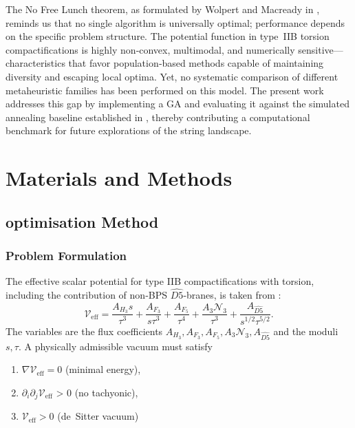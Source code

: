 \documentclass[runningheads]{llncs}
\begin{document}
The No Free Lunch theorem, as formulated by Wolpert and
Macready in \cite{Wolpert1997}, reminds us that no
single algorithm is universally optimal; performance
depends on the specific problem structure. The potential
function in type~IIB torsion compactifications is highly
non‑convex, multimodal, and numerically sensitive—
characteristics that favor population‑based methods
capable of maintaining diversity and escaping local
optima. Yet, no systematic comparison of different
metaheuristic families has been performed on this model.
The present work addresses this gap by implementing a GA
and evaluating it against the simulated annealing
baseline established in \cite{Damian2022}, thereby
contributing a computational benchmark for future
explorations of the string landscape.


\section{Materials and Methods}

\subsection{optimisation Method}

\subsubsection{Problem Formulation}
The effective scalar potential for type IIB compactifications
with torsion, including the contribution of non‑BPS
$\widehat{D5}$‑branes, is taken from \cite{Damian2022}:
\[
\mathcal{V}_{\mathrm{eff}} = \frac{A_{H_3}s}{\tau^3}
                           + \frac{A_{F_3}}{s\tau^3}
                           + \frac{A_{F_5}}{\tau^4}
                           + \frac{A_3\mathcal{N}_3}{\tau^3}
                           + \frac{A_{\widehat{D5}}}{s^{1/2}\tau^{5/2}}.
\]
The variables are the flux coefficients
$A_{H_3}, A_{F_3}, A_{F_5}, A_3\mathcal{N}_3, A_{\widehat{D5}}$
and the moduli $s,\tau$. A physically admissible vacuum must
satisfy

\begin{enumerate}
    \item[] $\nabla\mathcal{V}_{\mathrm{eff}} = 0$ (minimal energy),
    \item[] $\partial_i\partial_j\mathcal{V}_{\mathrm{eff}}$ > 0 (no tachyonic),
    \item[] $\mathcal{V}_{\mathrm{eff}} > 0$ (de~Sitter vacuum)
\end{enumerate}
\newpage
\end{document}

